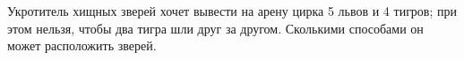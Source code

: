 \question
Укротитель хищных зверей хочет вывести на арену цирка 5 львов и 4 тигров; при этом нельзя, чтобы два тигра шли друг за другом. Сколькими способами он может расположить зверей.
